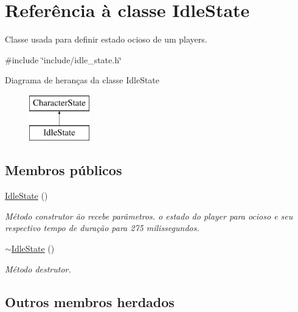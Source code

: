 \hypertarget{classIdleState}{}\section{Referência à classe Idle\+State}
\label{classIdleState}


Classe usada para definir estado ocioso de um players.  




{\ttfamily \#include \char`\"{}include/idle\+\_\+state.\+h\char`\"{}}

Diagrama de heranças da classe Idle\+State\begin{figure}[H]
\begin{center}
\leavevmode
\includegraphics[height=2.000000cm]{classIdleState}
\end{center}
\end{figure}
\subsection*{Membros públicos}
\begin{DoxyCompactItemize}
\item 
\mbox{\label{classIdleState_a2e97a195d3168ac0659cf0e432e5a3f3}} 
\mbox{\hyperlink{classIdleState_a2e97a195d3168ac0659cf0e432e5a3f3}{Idle\+State}} ()
\begin{DoxyCompactList}\small\item\em Método construtor ão recebe parâmetros.  o estado do player para ocioso e seu respectivo tempo de duração para 275 milissegundos. \end{DoxyCompactList}\item 
\mbox{\label{classIdleState_ab2a535f0b86b5797c769f1d5eb28b048}} 
\mbox{\hyperlink{classIdleState_ab2a535f0b86b5797c769f1d5eb28b048}{$\sim$\+Idle\+State}} ()
\begin{DoxyCompactList}\small\item\em Método destrutor. \end{DoxyCompactList}\end{DoxyCompactItemize}
\subsection*{Outros membros herdados}


